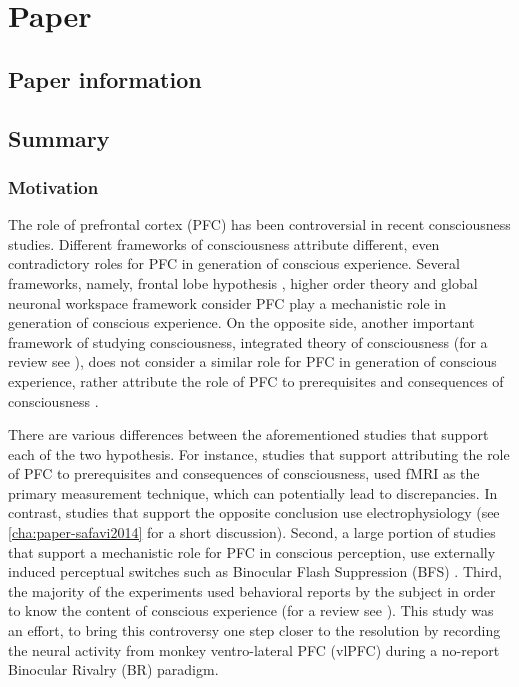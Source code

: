 \chapter{Paper }\label{cha:paper-kapoor2020}
\section*{Paper information} %



\section*{Summary} %
\subsection*{Motivation}
The role of prefrontal cortex (PFC) has been controversial in recent consciousness studies.
Different frameworks of consciousness attribute different, even contradictory roles for PFC in generation of conscious experience.
Several frameworks, namely,
frontal lobe hypothesis \cite{crickConsciousnessNeuroscience1998},
higher order theory \cite{lauEmpiricalSupportHigherorder2011} and
global neuronal workspace framework \cite{baarsGlobalWorkspaceTheory2005,dehaeneExperimentalTheoreticalApproaches2011}
consider PFC play a mechanistic role in generation of conscious experience.
On the opposite side, another important framework of studying consciousness,
integrated theory of consciousness \cite{tononiInformationIntegrationTheory2004,balduzziIntegratedInformationDiscrete2008b,balduzziQualiaGeometryIntegrated2009b,oizumiPhenomenologyMechanismsConsciousness2014}
(for a review see \citet{tononiIntegratedInformationTheory2016}),
does not consider a similar role for PFC in generation of conscious experience,
rather attribute the role of PFC to prerequisites and consequences of  consciousness
\cite{aruDistillingNeuralCorrelates2012,degraafCorrelatesNeuralCorrelates2012}.

There are various differences between the aforementioned studies that support each of the two hypothesis.
For instance, studies that support attributing the role of PFC to prerequisites and consequences of consciousness,
used fMRI as the primary measurement technique, which can potentially lead to discrepancies.
In contrast, studies that support the opposite conclusion use electrophysiology
(see \autoref{cha:paper-safavi2014} for a short discussion).
Second, a large portion of studies that support a mechanistic role for PFC in conscious perception,
use externally induced perceptual switches such as Binocular Flash Suppression (BFS) \cite{panagiotaropoulosNeuronalDischargesGamma2012}.
Third, the majority of the experiments used behavioral reports by the subject in order to know the content of conscious experience (for a review see \cite{tsuchiyaNoReportParadigmsExtracting2015,kochNeuralCorrelatesConsciousness2016}).
This study was an effort, to bring this controversy one step closer to the resolution by
recording the neural activity from monkey ventro-lateral PFC (vlPFC) during a no-report Binocular Rivalry (BR) paradigm.

